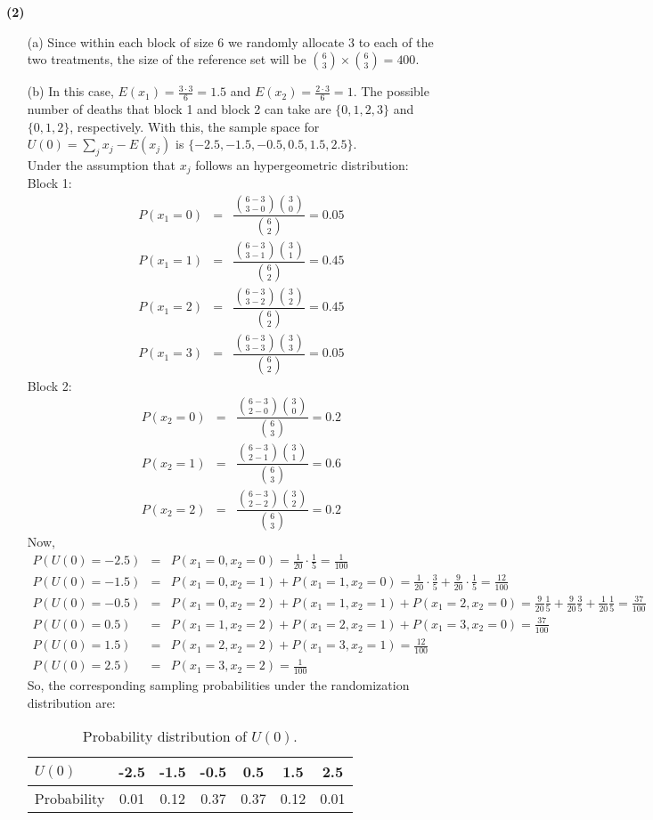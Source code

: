 \documentclass[11pt,a4paper]{article}
\begin{document}
\noindent
\textbf{(2)}
\begin{enumerate}
\item[(a)] Since within each block of size 6 we randomly allocate 3 to each of the two treatments, the size of the reference set will be $\binom{6}{3}\times \binom{6}{3}=400$.
\item[(b)] In this case, $E(x_1)=\frac{3\cdot 3}{6}=1.5$ and $E(x_2)=\frac{2\cdot 3}{6}=1$. The possible number of deaths that block 1 and block 2 can take are $\{0,1,2,3\}$ and $\{0,1,2\}$, respectively. With this, the sample space for $U(0)=\sum_j x_j-E(x_j)$ is $\{-2.5,-1.5,-0.5,0.5,1.5,2.5\}$.\\
Under the assumption that $x_j$ follows an hypergeometric distribution: \\
\noindent
Block 1:
\begin{eqnarray*}
P(x_1=0)&=&\dfrac{\binom{6-3}{3-0}\binom{3}{0}}{\binom{6}{2}}=0.05\\
P(x_1=1)&=&\dfrac{\binom{6-3}{3-1}\binom{3}{1}}{\binom{6}{2}}=0.45\\
P(x_1=2)&=&\dfrac{\binom{6-3}{3-2}\binom{3}{2}}{\binom{6}{2}}=0.45\\
P(x_1=3)&=&\dfrac{\binom{6-3}{3-3}\binom{3}{3}}{\binom{6}{2}}=0.05
\end{eqnarray*}
\noindent
Block 2:
\begin{eqnarray*}
P(x_2=0)&=&\dfrac{\binom{6-3}{2-0}\binom{3}{0}}{\binom{6}{3}}=0.2\\
P(x_2=1)&=&\dfrac{\binom{6-3}{2-1}\binom{3}{1}}{\binom{6}{3}}=0.6\\
P(x_2=2)&=&\dfrac{\binom{6-3}{2-2}\binom{3}{2}}{\binom{6}{3}}=0.2
\end{eqnarray*}
Now,
\begin{eqnarray*}
P(U(0)=-2.5) &=& P(x_1=0,x_2=0) = \frac{1}{20}\cdot\frac{1}{5} = \frac{1}{100}\\
P(U(0)=-1.5) &=& P(x_1=0,x_2=1)+P(x_1=1,x_2=0) = \frac{1}{20}\cdot\frac{3}{5} + \frac{9}{20}\cdot\frac{1}{5} = \frac{12}{100}\\
P(U(0)=-0.5) &=& P(x_1=0,x_2=2)+P(x_1=1,x_2=1)+P(x_1=2,x_2=0)  = \frac{9}{20}\frac{1}{5} + \frac{9}{20}\frac{3}{5} + \frac{1}{20}\frac{1}{5} = \frac{37}{100}\\
P(U(0)=0.5) &=& P(x_1=1,x_2=2)+P(x_1=2,x_2=1)+P(x_1=3,x_2=0) = \frac{37}{100}\\
P(U(0)=1.5) &=& P(x_1=2,x_2=2)+P(x_1=3,x_2=1) = \frac{12}{100}\\
P(U(0)=2.5) &=& P(x_1=3,x_2=2) = \frac{1}{100}
\end{eqnarray*}
So, the corresponding sampling probabilities under the randomization distribution are:
\begin{table}[H]
\centering
\begin{tabular}{lcccccc}
  \hline
$U(0)$ & -2.5 & -1.5 & -0.5 & 0.5 & 1.5 & 2.5 \\
  \hline
Probability & 0.01 &0.12& 0.37& 0.37& 0.12& 0.01\\
   \hline
\end{tabular}
\caption{Probability distribution of $U(0)$.}
\end{table}


\end{enumerate}
\end{document}
